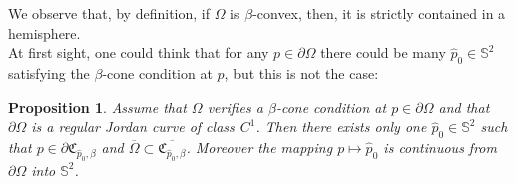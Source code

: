 \documentclass[a4paper,reqno,10pt,oneside]{amsart}
\numberwithin{equation}{section}
\newtheorem{proposition}[theorem]{Proposition}
\begin{document}
We observe that, by definition, if $\Omega$ is $\beta$-convex, then, it is strictly contained in a hemisphere.\\

At first sight, one could think that for any $p \in \partial \Omega$ there could be many $\hat p_0 \in \mathbb{S}^2$ satisfying the $\beta$-cone condition at $p$, but this is not the case:

\begin{proposition} \label{propclassadmvers}
Assume that $\Omega$ verifies a $\beta$-cone condition at $p \in \partial \Omega$ and that $\partial \Omega$ is a regular Jordan curve of class $C^1$. Then there exists only one $\hat p_0 \in \mathbb{S}^2$ such that $p \in \partial {\mathfrak{C}_{\hat p_0, \beta}}$ and $\overline\Omega \subset \overline{\mathfrak{C}_{\hat p_0, \beta}}$. Moreover the mapping $p \mapsto \hat p_0$ is continuous from $\partial \Omega$ into $\mathbb{S}^2$.
\end{proposition}
\end{document}
